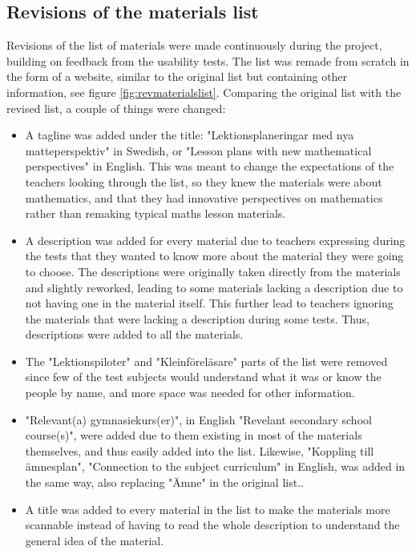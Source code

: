 \newpage

\subsection{Revisions of the materials list}
Revisions of the list of materials were made continuously during the project, building on feedback from the usability tests. The list was remade from scratch in the form of a website, similar to the original list but containing other information, see figure \ref{fig:revmaterialslist}. Comparing the original list with the revised list, a couple of things were changed:
\begin{itemize}
	\item A tagline was added under the title: "Lektionsplaneringar med nya matteperspektiv" in Swedish, or "Lesson plans with new mathematical perspectives" in English. This was meant to change the expectations of the teachers looking through the list, so they knew the materials were about mathematics, and that they had innovative perspectives on mathematics rather than remaking typical maths lesson materials.
	\item A description was added for every material due to teachers expressing during the tests that they wanted to know more about the material they were going to choose. The descriptions were originally taken directly from the materials and slightly reworked, leading to some materials lacking a description due to not having one in the material itself. This further lead to teachers ignoring the materials that were lacking a description during some tests. Thus, descriptions were added to all the materials.
	\item The "Lektionspiloter" and "Kleinföreläsare" parts of the list were removed since few of the test subjects would understand what it was or know the people by name, and more space was needed for other information.
	\item "Relevant(a) gymnasiekurs(er)", in English "Revelant secondary school course(s)", were added due to them existing in most of the materials themselves, and thus easily added into the list. Likewise, "Koppling till ämnesplan", "Connection to the subject curriculum" in English, was added in the same way, also replacing "Ämne" in the original list..
	\item A title was added to every material in the list to make the materials more scannable instead of having to read the whole description to understand the general idea of the material.
\end{itemize}

